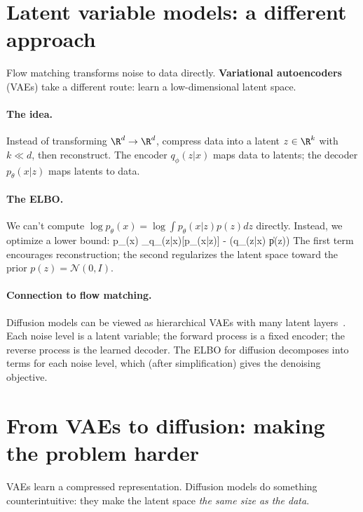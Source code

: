 \documentclass[11pt]{article}
\begin{document}
\section{Latent variable models: a different approach}

Flow matching transforms noise to data directly. \textbf{Variational autoencoders} (VAEs) take a different route: learn a low-dimensional latent space.

\paragraph{The idea.} Instead of transforming $\R^d \to \R^d$, compress data into a latent $z \in \R^k$ with $k \ll d$, then reconstruct. The encoder $q_\phi(z|x)$ maps data to latents; the decoder $p_\theta(x|z)$ maps latents to data.

\paragraph{The ELBO.} We can't compute $\log p_\theta(x) = \log \int p_\theta(x|z) p(z) dz$ directly. Instead, we optimize a lower bound:
\beq
\log p_\theta(x) \geq \E_{q_\phi(z|x)}[\log p_\theta(x|z)] - (q_\phi(z|x) \| p(z))
\eeq
The first term encourages reconstruction; the second regularizes the latent space toward the prior $p(z) = \mathcal{N}(0, I)$.

\paragraph{Connection to flow matching.} Diffusion models can be viewed as hierarchical VAEs with many latent layers~\cite{kingma2021variational}. Each noise level is a latent variable; the forward process is a fixed encoder; the reverse process is the learned decoder. The ELBO for diffusion decomposes into terms for each noise level, which (after simplification) gives the denoising objective.

\section{From VAEs to diffusion: making the problem harder}

VAEs learn a compressed representation. Diffusion models do something counterintuitive: they make the latent space \emph{the same size as the data}.
\end{document}
